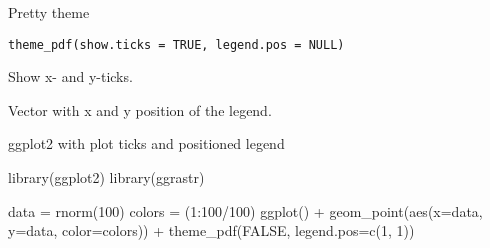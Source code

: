 \documentclass[a4paper]{book}
\begin{document}
%
\begin{Description}\relax
Pretty theme
\end{Description}
%
\begin{Usage}
\begin{verbatim}
theme_pdf(show.ticks = TRUE, legend.pos = NULL)
\end{verbatim}
\end{Usage}
%
\begin{Arguments}
\begin{ldescription}
\item[\code{show.ticks}] Show x- and y-ticks.

\item[\code{legend.pos}] Vector with x and y position of the legend.
\end{ldescription}
\end{Arguments}
%
\begin{Value}
ggplot2 with plot ticks and positioned legend
\end{Value}
%
\begin{Examples}
\begin{ExampleCode}
library(ggplot2)
library(ggrastr)

data = rnorm(100)
colors = (1:100/100)
ggplot() + geom_point(aes(x=data, y=data, color=colors)) + theme_pdf(FALSE, legend.pos=c(1, 1))

\end{ExampleCode}
\end{Examples}
\printindex{}
\end{document}
